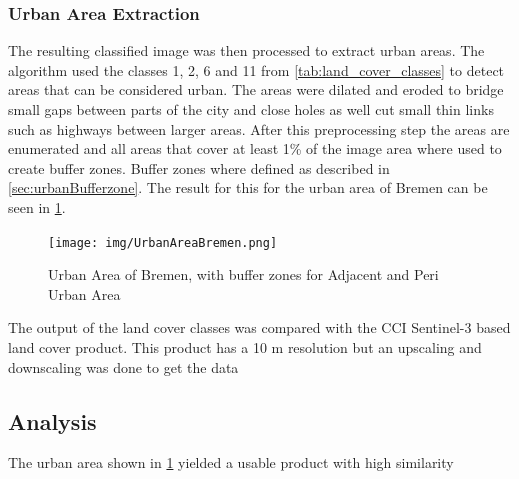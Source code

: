 \documentclass[12pt,a4paper, english,twoside]{scrartcl}
\begin{document}
    \subsubsection{Urban Area Extraction}\label{sec:urbanAreaExtraction}
      The resulting classified image was then processed to extract urban areas.
      The algorithm used the classes 1, 2, 6 and 11 from \cref{tab:land_cover_classes} to detect areas that can be considered urban.
      The areas were \gls{dilated} and \gls{eroded} to bridge small gaps between parts of the city and close holes as well cut small thin links such as highways between larger areas.
      After this preprocessing step the areas are enumerated and all areas that cover at least 1\% of the image area where used to create buffer zones. 
      Buffer zones where defined as described in \cref{sec:urbanBufferzone}. 
      The result for this for the urban area of Bremen can be seen in \cref{fig:bufferedBremen}.\\
      \begin{figure}
        \texttt{[image: img/UrbanAreaBremen.png]}
        \caption{Urban Area of Bremen, with buffer zones for Adjacent and Peri Urban Area\label{fig:bufferedBremen}}
      \end{figure}
  The output of the land cover classes was compared with the CCI Sentinel-3 based land cover product. 
  This product has a 10 m resolution but an upscaling and downscaling was done to get the data 
 \subsection{Analysis}\label{sec:landcoverAnalysis} 
The urban area shown in \cref{fig:bufferedBremen} yielded a usable product with high similarity 
   
\end{document}
